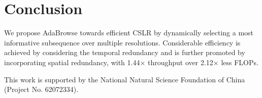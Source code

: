 \documentclass[sigconf]{acmart}
\begin{document}
\section{Conclusion}
We propose AdaBrowse towards efficient CSLR by dynamically selecting a most informative subsequence over multiple resolutions. Considerable efficiency is achieved by considering the temporal redundancy and is further promoted by incorporating spatial redundancy, with 1.44$\times$ throughput over 2.12$\times$ less FLOPs.\begin{acks}
This work is supported by the National Natural Science Foundation of China (Project No. 62072334).
\end{acks}





\appendix
\end{document}

